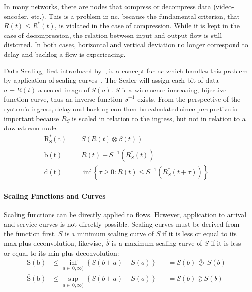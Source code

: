 In many networks, there are nodes that compress or decompress data (video-encoder, etc.).
This is a problem in \gls{nc}, because the fundamental criterion, that $R(t) \le R^*(t)$, is
violated in the case of compression. While it is kept in the case of decompression,
the relation between input and output flow is still distorted. In both cases,  horizontal and vertical deviation
no longer correspond to delay and backlog a flow is experiencing.
\par
Data Scaling, first introduced by~\citeauthor{fidler_way_2006}, is a concept for \gls{nc} which handles this problem by application of scaling curves~\cite{fidler_way_2006}.
The Scaler will assign each bit of data $a = R(t)$ a scaled image of $S(a)$.
$S$ is a wide-sense increasing, bijective function curve, thus an inverse function $S^{-1}$ exists.
From the perspective of the system's ingress, delay and backlog can then be calculated since
perspective is important because $R_S$ is scaled in relation to the ingress, but not in relation to a downstream node.
%
\begin{equation}
\begin{aligned}
\mathrm{R_S^*(t)} &= S(R(t) \otimes \beta(t))\\
\\
\mathrm{b(t)} &= R(t) - S^{-1}(R_S^*(t))\\
\mathrm{d(t)} &= \inf\left\{\tau \ge 0 : R(t) \le S^{-1}(R_S^*(t+\tau)) \right\}
\label{eq:scaler1}
\end{aligned}
\end{equation}
%
\paragraph{Scaling Functions and Curves}
Scaling functions can be directly applied to flows. However, application to arrival and service curves
is not directly possible. Scaling curves must be derived from the function first. $\underline{S}$ is a minimum scaling curve of $S$ if it is less or equal to its max-plus deconvolution, likewise, $\overline{S}$ is a maximum scaling curve of $S$ if
it is less or equal to its min-plus deconvolution:
%
\begin{equation}
\begin{aligned}
\mathrm{\underline{S}(b)} &\le \inf_{a \in [0,\infty)} \left \{ S(b+a) - S(a) \right \} &&= S(b)\phantom{~}\overline{\oslash}\phantom{~}S(b)\\
\mathrm{\overline{S}(b)}  &\le \sup_{a \in [0,\infty)} \left \{ S(b+a) - S(a) \right \} &&= S(b) \oslash S(b)
\label{eq:scaler2}
\end{aligned}
\end{equation}
%
